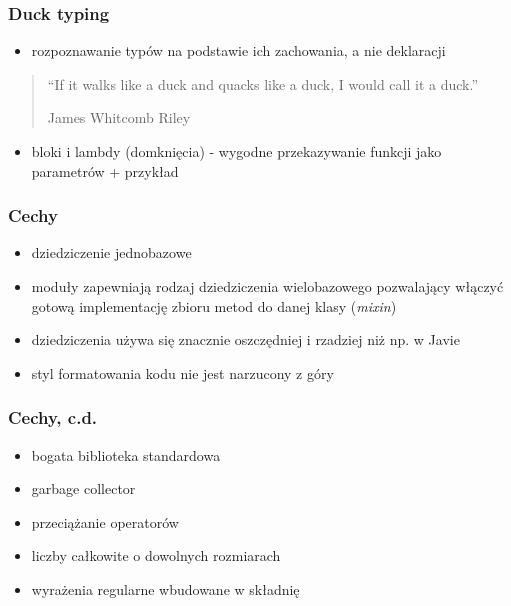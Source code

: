 \documentclass[12t]{beamer}
\begin{document}
\begin{frame}
  \frametitle{Duck typing}
  \begin{itemize}
  \item rozpoznawanie typów na podstawie ich zachowania, a nie deklaracji
  \end{itemize}
\end{frame}

\begin{frame}
  \begin{quote}
    “If it walks like a duck and quacks like a duck, I would call it a
    duck.”

    \hfill James Whitcomb Riley
  \end{quote}
\end{frame}

\begin{frame}
  \begin{itemize}
  \item bloki i lambdy (domknięcia) - wygodne przekazywanie funkcji
    jako parametrów + przykład
  \end{itemize}
\end{frame}

\begin{frame}
  \frametitle{Cechy}
  \begin{itemize}
  \item dziedziczenie jednobazowe
  \item moduły zapewniają rodzaj dziedziczenia wielobazowego
    pozwalający włączyć gotową implementację zbioru metod do danej
    klasy (\emph{mixin})
  \item dziedziczenia używa się znacznie oszczędniej i rzadziej niż
    np. w Javie
  \item styl formatowania kodu nie jest narzucony z góry
  \end{itemize}
\end{frame}

\begin{frame}
  \frametitle{Cechy, c.d.}
  \begin{itemize}
  \item bogata biblioteka standardowa
  \item garbage collector
  \item przeciążanie operatorów
  \item liczby całkowite o dowolnych rozmiarach
  \item wyrażenia regularne wbudowane w składnię
  \end{itemize}
\end{frame}
\end{document}
